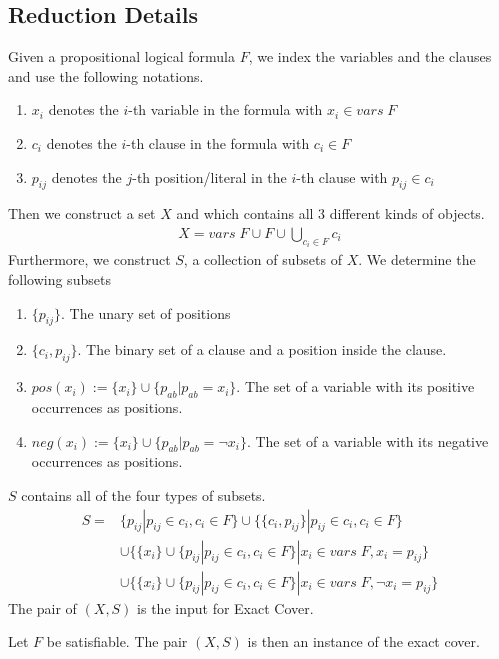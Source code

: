 \subsection{Reduction Details}
Given a propositional logical formula $F$, we index the variables and the clauses and use the following notations.
\begin{enumerate}
    \item $x_i$ denotes the $i$-th variable in the formula with $x_i \in vars\; F$
    \item $c_i$ denotes the $i$-th clause in the formula with $c_i \in F$
    \item $p_{ij}$ denotes the $j$-th position/literal in the $i$-th clause with $p_{ij} \in c_i$
\end{enumerate} 
Then we construct a set $X$ and which contains all 3 different kinds of objects. 
\begin{align*}
    X = vars\; F \cup F \cup \bigcup_{c_i \in F} c_i
\end{align*}
Furthermore, we construct $S$, a collection of subsets of $X$. We determine the following subsets
\begin{enumerate}
    \item $\{p_{ij}\}$. The unary set of positions
    \item $\{c_i, p_{ij}\}$. The binary set of a clause and a position inside the clause.
    \item $pos(x_i) := \{x_i\} \cup \{p_{ab} | p_{ab} = x_i\}$. The set of a variable with its positive occurrences as positions.
    \item $neg(x_i):= \{x_i\} \cup \{p_{ab} | p_{ab} = \neg x_i\}$. The set of a variable with  its negative occurrences as positions.
\end{enumerate}
$S$ contains all of the four types of subsets.
\begin{align*}
    S =& \{{p_{ij}} | p_{ij} \in c_i, c_i \in F \} 
    \cup \{\{c_i, p_{ij}\} | p_{ij} \in c_i, c_i \in F \} \\
    &\cup \{\{x_i\} \cup \{p_{ij} | p_{ij} \in c_i, c_i \in F\} | x_i \in vars\; F, x_i = p_{ij}\}\\
    &\cup \{\{x_i\} \cup \{p_{ij} | p_{ij} \in c_i, c_i \in F\} | x_i \in vars\; F, \neg x_i = p_{ij}\}
\end{align*}
The pair of $(X, S)$ is the input for Exact Cover. 
\begin{lemma}[Soundess]
    Let $F$ be satisfiable. The pair $(X, S)$ is then an instance of the exact cover.
\end{lemma}

